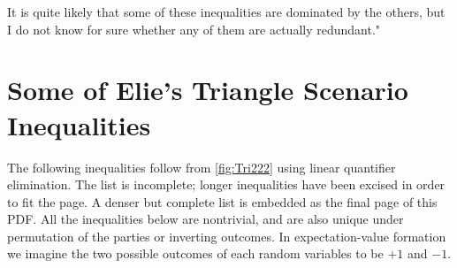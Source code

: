 It is quite likely that some of these inequalities are dominated by the others, but I do not know for sure whether any of them are actually redundant."



\section{Some of Elie's Triangle Scenario Inequalities}

The following inequalities follow from \cref{fig:Tri222} using linear quantifier elimination. The list is incomplete; longer inequalities have been excised in order to fit the page. A denser but complete list is embedded as the final page of this PDF. All the inequalities below are nontrivial, and are also unique under permutation of the parties or inverting outcomes. In expectation-value formation we imagine the two possible outcomes of each random variables to be $+1$ and $-1$.

